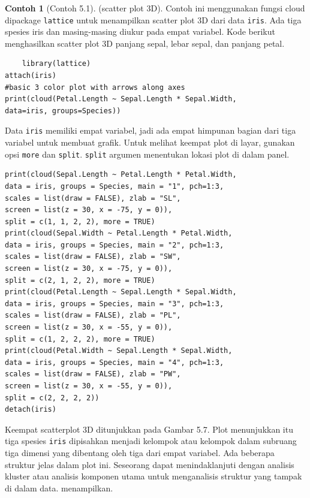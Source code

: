 \documentclass[a4paper,12pt]{article}
\theoremstyle{definition}
\newtheorem{example}{Contoh}[section]
\begin{document}
\begin{example}[Contoh 5.1](scatter plot 3D). Contoh ini menggunakan fungsi cloud dipackage \texttt{lattice} untuk menampilkan scatter plot 3D dari data \texttt{iris}. Ada
tiga spesies iris dan masing-masing diukur pada empat variabel. Kode berikut menghasilkan scatter plot 3D panjang sepal, lebar sepal, dan panjang petal. 
\begin{lstlisting}
    library(lattice)
attach(iris)
#basic 3 color plot with arrows along axes
print(cloud(Petal.Length ~ Sepal.Length * Sepal.Width,
data=iris, groups=Species))
\end{lstlisting}

Data \texttt{iris} memiliki empat variabel, jadi ada empat himpunan bagian dari tiga variabel
untuk membuat grafik. Untuk melihat keempat plot di layar, gunakan opsi \texttt{more} dan \texttt{split}.
\texttt{split} argumen menentukan lokasi plot di dalam panel. 

\begin{lstlisting}
print(cloud(Sepal.Length ~ Petal.Length * Petal.Width,
data = iris, groups = Species, main = "1", pch=1:3,
scales = list(draw = FALSE), zlab = "SL",
screen = list(z = 30, x = -75, y = 0)),
split = c(1, 1, 2, 2), more = TRUE)
print(cloud(Sepal.Width ~ Petal.Length * Petal.Width,
data = iris, groups = Species, main = "2", pch=1:3,
scales = list(draw = FALSE), zlab = "SW",
screen = list(z = 30, x = -75, y = 0)),
split = c(2, 1, 2, 2), more = TRUE)
print(cloud(Petal.Length ~ Sepal.Length * Sepal.Width,
data = iris, groups = Species, main = "3", pch=1:3,
scales = list(draw = FALSE), zlab = "PL",
screen = list(z = 30, x = -55, y = 0)),
split = c(1, 2, 2, 2), more = TRUE)
print(cloud(Petal.Width ~ Sepal.Length * Sepal.Width,
data = iris, groups = Species, main = "4", pch=1:3,
scales = list(draw = FALSE), zlab = "PW",
screen = list(z = 30, x = -55, y = 0)),
split = c(2, 2, 2, 2))
detach(iris)
\end{lstlisting}
\end{example}

Keempat scatterplot 3D ditunjukkan pada Gambar 5.7. Plot menunjukkan itu tiga spesies \texttt{iris} dipisahkan menjadi kelompok atau kelompok dalam subruang tiga dimensi yang dibentang oleh tiga dari empat variabel. Ada beberapa struktur jelas dalam plot ini. Seseorang dapat menindaklanjuti dengan analisis kluster atau analisis komponen utama untuk menganalisis struktur yang tampak di dalam data.
menampilkan.
\end{document}
